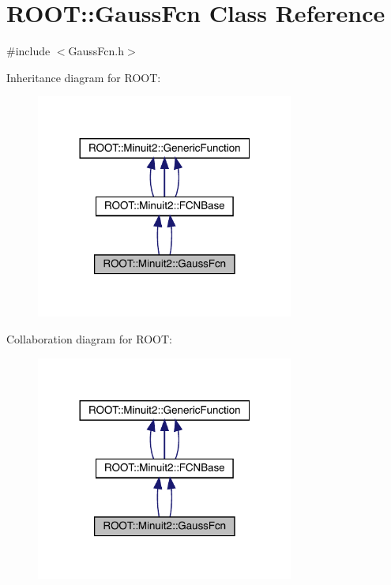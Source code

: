 \hypertarget{classROOT_1_1Minuit2_1_1GaussFcn}{}\section{R\+O\+OT\+:\+:Gauss\+Fcn Class Reference}
\label{classROOT_1_1Minuit2_1_1GaussFcn}


{\ttfamily \#include $<$Gauss\+Fcn.\+h$>$}



Inheritance diagram for R\+O\+OT\+:
\nopagebreak
\begin{figure}[H]
\begin{center}
\leavevmode
\includegraphics[width=240pt]{dc/d41/classROOT_1_1Minuit2_1_1GaussFcn__inherit__graph}
\end{center}
\end{figure}


Collaboration diagram for R\+O\+OT\+:
\nopagebreak
\begin{figure}[H]
\begin{center}
\leavevmode
\includegraphics[width=240pt]{d3/d3f/classROOT_1_1Minuit2_1_1GaussFcn__coll__graph}
\end{center}
\end{figure}
